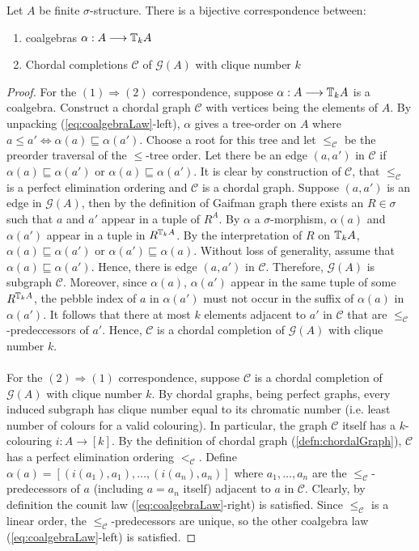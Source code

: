 \begin{prop}
Let $A$ be finite $\sigma$-structure. There is a bijective correspondence between:
\begin{enumerate}[label=(\arabic*)]
\item coalgebras $\alpha:A \longrightarrow {\mathbb{T}_{k}A}$
\item Chordal completions $\mathcal{C}$ of $\mathcal{G}(A)$ with clique number $k$
\end{enumerate}
\begin{proof}
For the $(1) \Rightarrow (2)$ correspondence, suppose $\alpha:A \longrightarrow {\mathbb{T}_{k}A}$ is a coalgebra. Construct a chordal graph $\mathcal{C}$ with vertices being the elements of $A$. By unpacking (\ref{eq:coalgebraLaw}-left), $\alpha$ gives a tree-order on $A$ where $a \leq a' \Leftrightarrow \alpha(a) \sqsubseteq \alpha(a')$. Choose a root for this tree and let $\leq_{\mathcal{C}}$ be the preorder traversal of the $\leq$-tree order. Let there be an edge $(a,a')$ in $\mathcal{C}$ if $\alpha(a) \sqsubseteq \alpha(a')$ or $\alpha(a) \sqsubseteq \alpha(a')$.   
It is clear by construction of $\mathcal{C}$, that $\leq_{\mathcal{C}}$ is a perfect elimination ordering and $\mathcal{C}$ is a chordal graph. Suppose $(a,a')$ is an edge in $\mathcal{G}(A)$, then by the definition of Gaifman graph there exists an $R \in \sigma$ such that $a$ and $a'$ appear in a tuple of $R^{A}$. By $\alpha$ a $\sigma$-morphism, $\alpha(a)$ and $\alpha(a')$ appear in a tuple in $R^{{\mathbb{T}_{k}A}}$. By the interpretation of $R$ on ${\mathbb{T}_{k}A}$, $\alpha(a) \sqsubseteq \alpha(a')$ or $\alpha(a') \sqsubseteq \alpha(a)$. Without loss of generality, assume that $\alpha(a) \sqsubseteq \alpha(a')$. Hence, there is edge $(a,a')$ in $\mathcal{C}$. Therefore, $\mathcal{G}(A)$ is subgraph $\mathcal{C}$. Moreover, since $\alpha(a)$, $\alpha(a')$ appear in the same tuple of some $R^{{\mathbb{T}_{k}A}}$, the pebble index of $a$ in $\alpha(a')$ must not occur in the suffix of $\alpha(a)$ in $\alpha(a')$. It follows that there at most $k$ elements adjacent to $a'$ in $\mathcal{C}$ that are $\leq_{\mathcal{C}}$-predeccessors of $a'$. Hence, $\mathcal{C}$ is a chordal completion of $\mathcal{G}(A)$ with clique number $k$. \\~\\
For the $(2) \Rightarrow (1)$ correspondence, suppose $\mathcal{C}$ is a chordal completion of $\mathcal{G}(A)$ with clique number $k$. By chordal graphs, being perfect graphs, every induced subgraph has clique number equal to its chromatic number (i.e. least number of colours for a valid colouring). In particular, the graph $\mathcal{C}$ itself has a $k$-colouring $i:A \longrightarrow [k]$. By the definition of chordal graph (\ref{defn:chordalGraph}), $\mathcal{C}$ has a perfect elimination ordering $<_{\mathcal{C}}$. Define $\alpha(a) = [(i(a_{1}),a_{1}),\dots,(i(a_{n}),a_{n})]$ where $a_{1},\dots,a_{n}$ are the $\leq_{\mathcal{C}}$-predecessors of $a$ (including $a = a_{n}$ itself) adjacent to $a$ in $\mathcal{C}$. Clearly, by definition the counit law (\ref{eq:coalgebraLaw}-right) is satisfied. Since $\leq_{\mathcal{C}}$ is a linear order, the $\leq_{\mathcal{C}}$-predecessors are unique, so the other coalgebra law (\ref{eq:coalgebraLaw}-left) is satisfied.       

\end{proof}
\end{prop}
